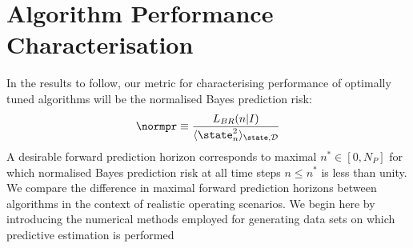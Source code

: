 \section{Algorithm Performance Characterisation \label{sec:main:Performance}}

In the results to follow, our metric for characterising performance of optimally tuned algorithms will be the normalised Bayes prediction risk:
\begin{align}
\normpr \equiv \frac{L_{BR}(n|I)}{\langle \state_n^2 \rangle_{\state, \mathcal{D}}} 
\end{align}
A desirable forward prediction horizon corresponds to maximal $n^* \in [0, N_P]$ for which normalised Bayes prediction risk at all time steps $n \leq n^*$ is less than unity. We compare the difference in maximal forward prediction horizons between algorithms in the context of realistic operating scenarios.  We begin here by introducing the numerical methods employed for generating data sets on which predictive estimation is performed








